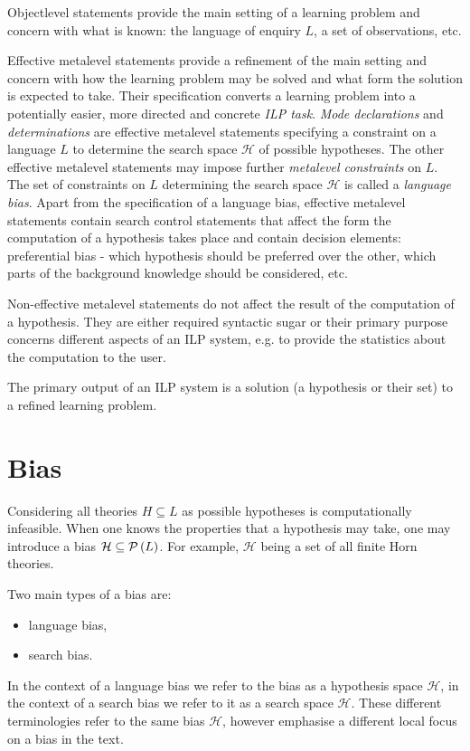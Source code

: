 Objectlevel statements provide the main setting of a learning problem and concern with what is known: the language of enquiry $L$, a set of observations, etc.

Effective metalevel statements provide a refinement of the main setting and concern with how the learning problem may be solved and what form the solution is expected to take. Their specification converts a learning problem into a potentially easier, more directed and concrete \emph{ILP task}.
\emph{Mode declarations} and \emph{determinations} are effective metalevel statements specifying a constraint on a language $L$ to determine the search space $\mathcal{H}$ of possible hypotheses. The other effective metalevel statements may impose further \emph{metalevel constraints} on $L$. The set of constraints on $L$ determining the search space $\mathcal{H}$ is called a \emph{language bias}.
Apart from the specification of a language bias, effective metalevel statements contain search control statements that affect the form the computation of a hypothesis takes place and contain decision elements: preferential bias - which hypothesis should be preferred over the other, which parts of the background knowledge should be considered, etc.

Non-effective metalevel statements do not affect the result of the computation of a hypothesis. They are either required syntactic sugar or their primary purpose concerns different aspects of an ILP system, e.g. to provide the statistics about the computation to the user.

The primary output of an ILP system is a solution (a hypothesis or their set) to a refined learning problem.

\section{Bias\cite{nienhuys1997foundations}}
Considering all theories $H \subseteq L$ as possible hypotheses is computationally infeasible. When one knows the properties that a hypothesis may take, one may introduce a bias $\mathcal{H} \subseteq \mathcal{P} \left({ L }\right)$. For example, $\mathcal{H}$ being a set of all finite Horn theories.

Two main types of a bias are:
\begin{itemize}
\item language bias,
\item search bias.
\end{itemize}

In the context of a language bias we refer to the bias as a hypothesis space $\mathcal{H}$, in the context of a search bias we refer to it as a search space $\mathcal{H}$.
These different terminologies refer to the same bias $\mathcal{H}$, however emphasise a different local focus on a bias in the text.


